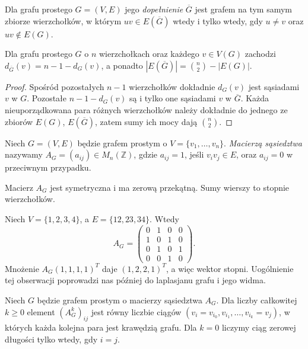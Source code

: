 \begin{definicja}[Dopełnienie]
Dla grafu prostego $G=(V,E)$ jego
\emph{dopełnienie} $\overline G$ jest grafem na
tym samym zbiorze wierzchołków, w którym
$uv\in E(\overline G)$ wtedy i tylko wtedy,
gdy $u\ne v$ oraz $uv\notin E(G)$.
\end{definicja}

\begin{stwierdzenie}
Dla grafu prostego $G$ o $n$ wierzchołkach oraz
każdego $v\in V(G)$ zachodzi
$d_{\overline G}(v)=n-1-d_G(v)$, a ponadto
$|E(\overline G)|=\binom n2-|E(G)|$.
\end{stwierdzenie}

\begin{proof}
Spośród pozostałych $n-1$ wierzchołków dokładnie
$d_G(v)$ jest sąsiadami $v$ w $G$. Pozostałe
$n-1-d_G(v)$ są i tylko one sąsiadami $v$ w
$\overline G$. Każda nieuporządkowana para różnych
wierzchołków należy dokładnie do jednego ze zbiorów
$E(G)$, $E(\overline G)$, zatem sumy ich mocy dają
$\binom n2$.
\end{proof}

\begin{definicja}
Niech $G=(V,E)$ będzie grafem prostym o
$V=\{v_1,\ldots,v_n\}$. \emph{Macierzą sąsiedztwa}
nazywamy $A_G=(a_{ij})\in M_n(\mathbb Z)$,
gdzie $a_{ij}=1$, jeśli $v_iv_j\in E$, oraz
$a_{ij}=0$ w przeciwnym przypadku.
\end{definicja}

Macierz $A_G$ jest symetryczna i ma zerową przekątną.
Sumy wierszy to stopnie wierzchołków.

\begin{przyklad}
Niech $V=\{1,2,3,4\}$, a $E=\{12,23,34\}$.
Wtedy
\[
A_G=\begin{pmatrix}
0&1&0&0\\1&0&1&0\\0&1&0&1\\0&0&1&0
\end{pmatrix}.
\]
Mnożenie $A_G(1,1,1,1)^T$ daje $(1,2,2,1)^T$,
a więc wektor stopni. Uogólnienie tej obserwacji
poprowadzi nas później do laplasjanu grafu i
jego widma.
\end{przyklad}

\begin{stwierdzenie}
Niech $G$ będzie grafem prostym o macierzy sąsiedztwa
$A_G$. Dla liczby całkowitej $k\ge0$ element
$(A_G^k)_{ij}$ jest równy liczbie ciągów
$(v_i=v_{i_0},v_{i_1},\ldots,v_{i_k}=v_j)$,
w których każda kolejna para jest krawędzią grafu.
Dla $k=0$ liczymy ciąg zerowej długości tylko wtedy,
gdy $i=j$.
\end{stwierdzenie}

